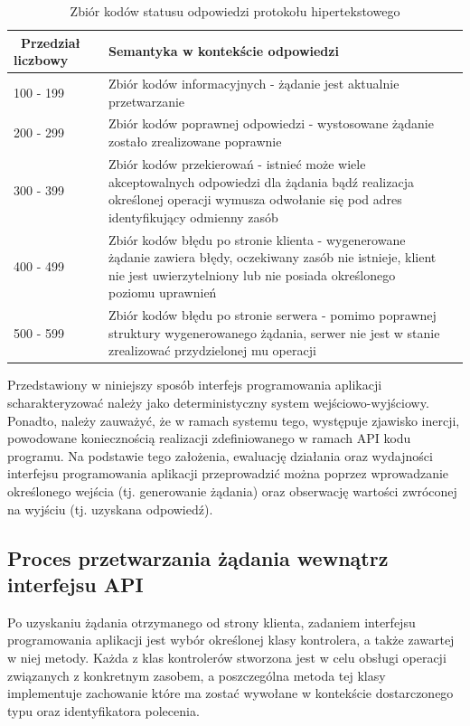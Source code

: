 \begin{table}[htbp] \small
\centering
\caption{Zbiór kodów statusu odpowiedzi protokołu hipertekstowego}
\label{tab:kody-odpowiedzi}
\begin{tabularx}{\linewidth}{|p{4cm}|X|X|} \hline\
Przedział liczbowy & Semantyka w kontekście odpowiedzi\\ \hline\hline
100 - 199 & Zbiór kodów informacyjnych - żądanie jest aktualnie przetwarzanie\\ \hline
200 - 299 & Zbiór kodów poprawnej odpowiedzi - wystosowane żądanie zostało zrealizowane poprawnie \\ \hline
300 - 399 & Zbiór kodów przekierowań - istnieć może wiele akceptowalnych odpowiedzi dla żądania bądź realizacja określonej operacji wymusza odwołanie się pod adres identyfikujący odmienny zasób \\ \hline
400 - 499 & Zbiór kodów błędu po stronie klienta - wygenerowane żądanie zawiera błędy, oczekiwany zasób nie istnieje, klient nie jest uwierzytelniony lub nie posiada określonego poziomu uprawnień \\ \hline
500 - 599 & Zbiór kodów błędu po stronie serwera - pomimo poprawnej struktury wygenerowanego żądania, serwer nie jest w stanie zrealizować przydzielonej mu operacji\\ \hline
\end{tabularx}
\end{table}

Przedstawiony w niniejszy sposób interfejs programowania aplikacji scharakteryzować należy jako deterministyczny system wejściowo-wyjściowy. Ponadto, należy zauważyć, że w ramach systemu tego, występuje zjawisko inercji, powodowane koniecznością realizacji zdefiniowanego w ramach API kodu programu. Na podstawie tego założenia, ewaluację działania oraz wydajności interfejsu programowania aplikacji przeprowadzić można poprzez wprowadzanie określonego wejścia (tj. generowanie żądania) oraz obserwację wartości zwróconej na wyjściu (tj. uzyskana odpowiedź).

\subsection*{Proces przetwarzania żądania wewnątrz interfejsu API}
Po uzyskaniu żądania otrzymanego od strony klienta, zadaniem interfejsu programowania aplikacji jest wybór określonej klasy kontrolera, a także zawartej w niej metody. Każda z klas kontrolerów stworzona jest w celu obsługi operacji związanych z konkretnym zasobem, a poszczególna metoda tej klasy implementuje zachowanie które ma zostać wywołane w kontekście dostarczonego typu oraz identyfikatora polecenia.

